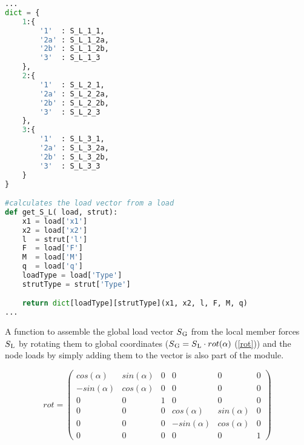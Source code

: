 \begin{inconsolata}
\begin{minipage}{\linewidth}
\begin{lstlisting}[language=python]
...
dict = {
    1:{
        '1'  : S_L_1_1,
        '2a' : S_L_1_2a,
        '2b' : S_L_1_2b,
        '3'  : S_L_1_3
    },
    2:{
        '1'  : S_L_2_1,
        '2a' : S_L_2_2a,
        '2b' : S_L_2_2b,
        '3'  : S_L_2_3
    },
    3:{
        '1'  : S_L_3_1,
        '2a' : S_L_3_2a,
        '2b' : S_L_3_2b,
        '3'  : S_L_3_3
    }
}

#calculates the load vector from a load
def get_S_L( load, strut):
    x1 = load['x1']
    x2 = load['x2']
    l  = strut['l']
    F  = load['F']
    M  = load['M']
    q  = load['q']
    loadType = load['Type']
    strutType = strut['Type']

    return dict[loadType][strutType](x1, x2, l, F, M, q)
...
\end{lstlisting}
\end{minipage}
\end{inconsolata}

A function to assemble the global load vector $S\textsubscript{G}$ from the local member forces $S\textsubscript{L}$ by rotating them to global coordinates ($S\textsubscript{G} = S\textsubscript{L} \cdot rot(\alpha)$ (\cref{rot})) and the node loads by simply adding them to the vector is also part of the module.

\begin{equation} \label{rot}
rot = \begin{pmatrix}
cos(\alpha)  & sin(\alpha)  & 0   & 0             & 0             & 0   \\[0.2em]
-sin(\alpha) & cos(\alpha)  & 0   & 0             & 0             & 0   \\[0.2em]
0            & 0            & 1   & 0             & 0             & 0   \\[0.2em]
0            & 0            & 0   & cos(\alpha)   & sin(\alpha)   & 0   \\[0.2em]
0            & 0            & 0   & -sin(\alpha)  & cos(\alpha)   & 0   \\[0.2em]
0            & 0            & 0   & 0             & 0             & 1
     \end{pmatrix}
\end{equation}

